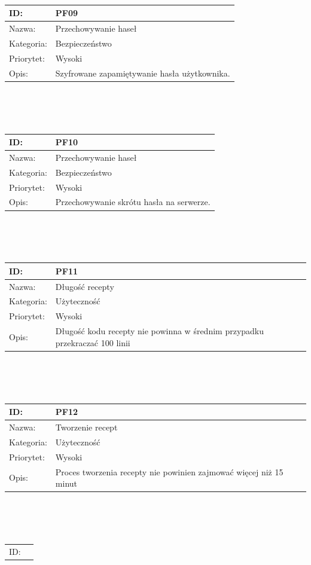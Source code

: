 \documentclass[11pt,a4paper,polish,thesis]{dcsbook}
\begin{document}
\begin{tabular}{|p{2cm}|p{12cm}|}
\\ \hline \end{tabular} \\\\\ \begin{tabular}{|p{2cm}|p{12cm}|}  \hline ID: &
PF09
\\ \hline Nazwa: &
Przechowywanie haseł
\\ \hline Kategoria: &
Bezpieczeństwo
\\ \hline Priorytet: &
Wysoki
\\ \hline Opis: &
Szyfrowane zapamiętywanie hasła użytkownika.

\\ \hline \end{tabular} \\\\\ \begin{tabular}{|p{2cm}|p{12cm}|}  \hline ID: &
PF10
\\ \hline Nazwa: &
Przechowywanie haseł
\\ \hline Kategoria: &
Bezpieczeństwo
\\ \hline Priorytet: &
Wysoki
\\ \hline Opis: &
Przechowywanie skrótu hasła na serwerze.
\\ \hline \end{tabular} \\\\\ \begin{tabular}{|p{2cm}|p{12cm}|}  \hline ID: &
PF11
\\ \hline Nazwa: &
Długość recepty
\\ \hline Kategoria: &
Użyteczność
\\ \hline Priorytet: &
Wysoki
\\ \hline Opis: &
Długość kodu recepty nie powinna w średnim przypadku przekraczać 100 linii
\\ \hline \end{tabular} \\\\\ \begin{tabular}{|p{2cm}|p{12cm}|}  \hline ID: &
PF12
\\ \hline Nazwa: &
Tworzenie recept
\\ \hline Kategoria: &
Użyteczność
\\ \hline Priorytet: &
Wysoki
\\ \hline Opis: &
Proces tworzenia recepty nie powinien zajmować więcej niż 15 minut
\\ \hline \end{tabular} \\\\\ \begin{tabular}{|p{2cm}|p{12cm}|}  \hline ID: &

\end{tabular}
\end{document}
